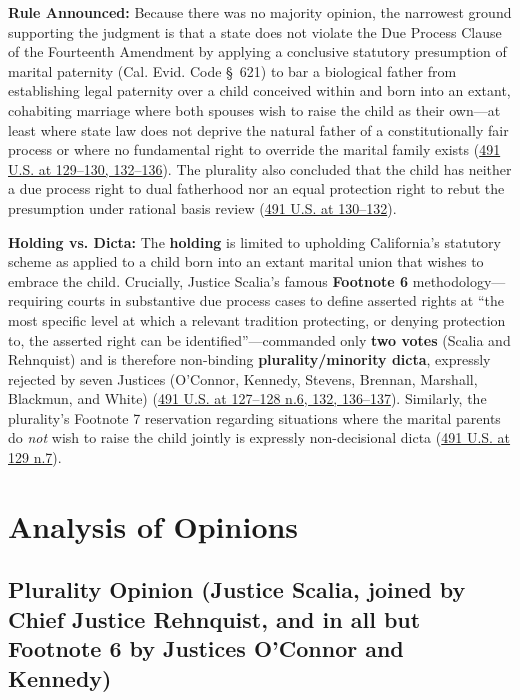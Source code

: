 \documentclass[12pt]{article}
\begin{document}
\textbf{Rule Announced:} Because there was no majority opinion, the narrowest ground supporting the judgment is that a state does not violate the Due Process Clause of the Fourteenth Amendment by applying a conclusive statutory presumption of marital paternity (Cal. Evid. Code \S~621) to bar a biological father from establishing legal paternity over a child conceived within and born into an extant, cohabiting marriage where both spouses wish to raise the child as their own---at least where state law does not deprive the natural father of a constitutionally fair process or where no fundamental right to override the marital family exists (\href{https://supreme.justia.com/cases/federal/us/491/110/}{491 U.S. at 129--130, 132--136}). The plurality also concluded that the child has neither a due process right to dual fatherhood nor an equal protection right to rebut the presumption under rational basis review (\href{https://supreme.justia.com/cases/federal/us/491/110/}{491 U.S. at 130--132}).

\textbf{Holding vs. Dicta:} The \textbf{holding} is limited to upholding California's statutory scheme as applied to a child born into an extant marital union that wishes to embrace the child. Crucially, Justice Scalia's famous \textbf{Footnote 6} methodology---requiring courts in substantive due process cases to define asserted rights at ``the most specific level at which a relevant tradition protecting, or denying protection to, the asserted right can be identified''---commanded only \textbf{two votes} (Scalia and Rehnquist) and is therefore non-binding \textbf{plurality/minority dicta}, expressly rejected by seven Justices (O'Connor, Kennedy, Stevens, Brennan, Marshall, Blackmun, and White) (\href{https://supreme.justia.com/cases/federal/us/491/110/}{491 U.S. at 127--128 n.6, 132, 136--137}). Similarly, the plurality's Footnote 7 reservation regarding situations where the marital parents do \textit{not} wish to raise the child jointly is expressly non-decisional dicta (\href{https://supreme.justia.com/cases/federal/us/491/110/}{491 U.S. at 129 n.7}).

\section{Analysis of Opinions}

\subsection{Plurality Opinion (Justice Scalia, joined by Chief Justice Rehnquist, and in all but Footnote 6 by Justices O'Connor and Kennedy)}
\end{document}
